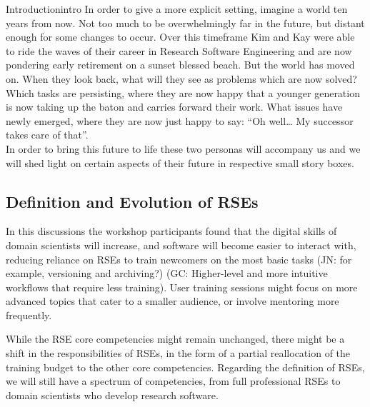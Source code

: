 \documentclass{eceasst}
\begin{document}
\begin{story}{Introduction}{intro}
In order to give a more explicit setting, imagine a world ten years from now.
Not too much to be overwhelmingly far in the future, but distant enough for some changes to occur.
Over this timeframe Kim\cite{Anzt2021} and Kay\cite{Goth2024}
were able to ride the waves of their career in Research Software Engineering and are now pondering early retirement on a sunset blessed beach.
But the world has moved on.
When they look back, what will they see as problems which are now solved?
Which tasks are persisting, where they are now happy that a younger generation is now taking up the baton and carries forward their work.
What issues have newly emerged, where they are now just happy to say: “Oh well… My successor takes care of that”.\\
In order to bring this future to life these two personas will accompany us and we will shed light on certain aspects
of their future in respective small story boxes.
 \end{story}


\subsection{Definition and Evolution of RSEs}
In this discussions the workshop participants found that
the digital skills of domain scientists will increase,
and software will become easier to interact with,
reducing reliance on RSEs to train newcomers on the most basic tasks
(JN: for example, versioning and archiving?)
(GC: Higher-level and more intuitive workflows that require less training).
User training sessions might focus on more advanced topics
that cater to a smaller audience, or involve mentoring more frequently.

While the RSE core competencies\cite{Goth2024} might remain unchanged,
there might be a shift in the responsibilities of RSEs,
in the form of a partial reallocation of the training budget
to the other core competencies.
Regarding the definition of RSEs, we will still have a spectrum of competencies,
from full professional RSEs to domain scientists who develop research software.
\end{document}
